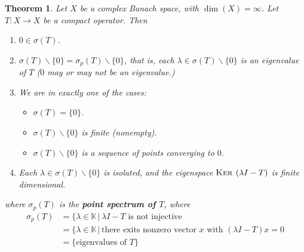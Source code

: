 \documentclass[10pt, oneside, reqno]{amsart}
\theoremstyle{plain}%
\newtheorem{thm}{Theorem}[section]
\theoremstyle{definition}
\theoremstyle{remark}
\newcommand{\given}{ \, | \,}
\newcommand{\K}{\mathbb{K}}
\renewcommand{\ker}{\textsc{Ker\ }}
\begin{document}
\begin{thm}
Let $X$ be a complex Banach space, with $\dim(X) = \infty$.  Let $T : X \rightarrow X$ be a compact operator.  Then \begin{enumerate}[(1)]
    \item $0 \in \sigma(T)$.  
    \item $\sigma(T) \backslash \{ 0 \} = \sigma_p(T) \backslash \{ 0 \}$, that is, each $\lambda \in \sigma(T) \backslash \{ 0 \}$ is an eigenvalue of $T$ ($0$ may or may not be an eigenvalue.)
    \item We are in exactly one of the cases:
     \begin{itemize}
        \item $\sigma(T) = \{ 0 \}$.
        \item $\sigma(T) \backslash \{ 0 \}$ is finite (nonempty).
        \item $\sigma(T) \backslash \{ 0 \}$ is a sequence of points converging to $0$.  
     \end{itemize}
     \item Each $\lambda \in \sigma(T) \backslash \{ 0 \}$ is isolated, and the eigenspace $\ker(\lambda I - T)$ is finite dimensional.  
\end{enumerate}  
where $\sigma_p(T)$ is the \textbf{point spectrum of $T$}, where \begin{align*}
    \sigma_p(T) &= \{ \lambda \in \K \given \text{$\lambda I - T$ is not injective} \\
                &= \{ \lambda \in \K \given \text{there exits nonzero vector $x$ with $(\lambda I - T)x = 0$} \\
                &= \{ \text{eigenvalues of $T$} \}
\end{align*}
\end{thm}
\end{document}
